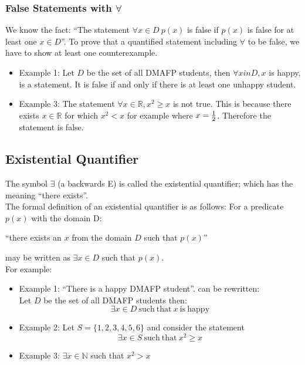 \subsubsection{False Statements with $\forall$}
We know the fact: ``The statement $\forall x \in D\ p(x)$ is false if $p(x)$ is false for at least one $x \in D$''. To prove that a quantified statement including $\forall$ to be false, we have to show at least one counterexample.
\begin{itemize}
    \item Example 1: Let $D$ be the set of all DMAFP students, then $\forall x in D, x$ is happy, is a statement. It is false if and only if there is at least one unhappy student.
    \item Example 3: The statement $\forall x \in \mathbb{R}, x^2 \geq x$ is not true. This is because there exists $x \in \mathbb{R}$ for which $x^2 < x$ for example where $x=\frac{1}{2} \displaystyle$. Therefore the statement is false. 
\end{itemize}

\subsection{Existential Quantifier}
The symbol $\exists$ (a backwards E) is called the existential quantifier; which has the meaning ``there exists''. \\

The formal definition of an existential quantifier is as follows: For a predicate $p(x)$ with the domain D:
\begin{center}
    ``there exists an $x$ from the domain $D$ such that $p(x)$''
\end{center}
may be written as $\exists x \in D$ such that $p(x)$.\\

For example:
\begin{itemize}
    \item Example 1: ``There is a happy DMAFP student''. can be rewritten:\\
    Let $D$ be the set of all DMAFP students then:
    \[\exists x \in D \mathrm{\ such\ that\ } x \mathrm{\ is\ happy}\]
    \item Example 2: Let $S = \{1, 2, 3, 4, 5, 6 \}$ and consider the statement
    \[\exists x \in S \mathrm{\ such\ that\ } x^2 \geq x\] 
    \item Example 3: $\exists x \in \mathbb{N}$ such that $x^2 >x$
\end{itemize}
